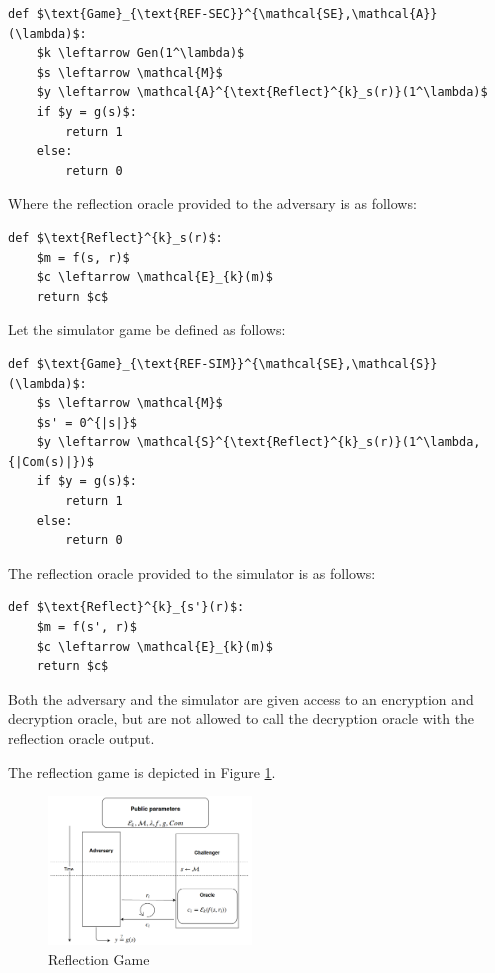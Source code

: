 \begin{lstlisting}[texcl,mathescape,basicstyle=\small]
def $\text{Game}_{\text{REF-SEC}}^{\mathcal{SE},\mathcal{A}}(\lambda)$:
    $k \leftarrow Gen(1^\lambda)$
    $s \leftarrow \mathcal{M}$
    $y \leftarrow \mathcal{A}^{\text{Reflect}^{k}_s(r)}(1^\lambda)$
    if $y = g(s)$:
        return 1
    else:
        return 0
\end{lstlisting}

Where the reflection oracle provided to the adversary is as follows:

\begin{lstlisting}[texcl,mathescape,basicstyle=\small]
def $\text{Reflect}^{k}_s(r)$:
    $m = f(s, r)$
    $c \leftarrow \mathcal{E}_{k}(m)$
    return $c$
\end{lstlisting}

Let the simulator game be defined as follows:

\begin{lstlisting}[texcl,mathescape,basicstyle=\small]
def $\text{Game}_{\text{REF-SIM}}^{\mathcal{SE},\mathcal{S}}(\lambda)$:
    $s \leftarrow \mathcal{M}$
    $s' = 0^{|s|}$
    $y \leftarrow \mathcal{S}^{\text{Reflect}^{k}_s(r)}(1^\lambda, {|Com(s)|})$
    if $y = g(s)$:
        return 1
    else:
        return 0
\end{lstlisting}

The reflection oracle provided to the simulator is as follows:

\begin{lstlisting}[texcl,mathescape,basicstyle=\small]
def $\text{Reflect}^{k}_{s'}(r)$:
    $m = f(s', r)$
    $c \leftarrow \mathcal{E}_{k}(m)$
    return $c$
\end{lstlisting}

Both the adversary and the simulator are given access to an encryption and decryption oracle, but
are not allowed to call the decryption oracle with the reflection oracle output.

The reflection game is depicted in Figure \ref{fig:refgame}.

    \begin{figure}[thpb]
        \centering
            \includegraphics[width=0.48\textwidth]{figures/reflection_game.png}
        \caption{Reflection Game}
        \label{fig:refgame}
    \end{figure}

